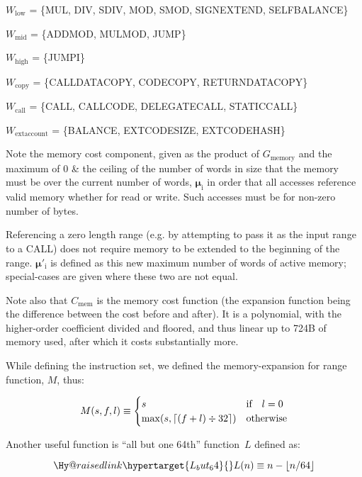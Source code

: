 \documentclass[9pt,oneside]{amsart}
\makeatletter
\newcommand{\linkdest}[1]{\Hy@raisedlink{\hypertarget{#1}{}}}
\DeclarePairedDelimiter{\ceil}{\lceil}{\rceil}
\makeatother
\begin{document}
$W_{\mathrm{low}}$ = \{{\small MUL}, {\small DIV}, {\small SDIV}, {\small MOD}, {\small SMOD}, {\small SIGNEXTEND}, {\small SELFBALANCE}\}

$W_{\mathrm{mid}}$ = \{{\small ADDMOD}, {\small MULMOD}, {\small JUMP}\}

$W_{\mathrm{high}}$ = \{{\small JUMPI}\}

$W_{\mathrm{copy}}$ = \{{\small CALLDATACOPY}, {\small CODECOPY}, {\small RETURNDATACOPY}\}

$W_{\mathrm{call}}$ = \{{\small CALL}, {\small CALLCODE}, {\small DELEGATECALL}, {\small STATICCALL}\}

$W_{\mathrm{extaccount}}$ = \{{\small BALANCE}, {\small EXTCODESIZE}, {\small EXTCODEHASH}\}

Note the memory cost component, given as the product of $G_{\mathrm{memory}}$ and the maximum of 0 \& the ceiling of the number of words in size that the memory must be over the current number of words, $\boldsymbol{\mu}_{\mathrm{i}}$ in order that all accesses reference valid memory whether for read or write. Such accesses must be for non-zero number of bytes.

Referencing a zero length range (e.g. by attempting to pass it as the input range to a CALL) does not require memory to be extended to the beginning of the range. $\boldsymbol{\mu}'_{\mathrm{i}}$ is defined as this new maximum number of words of active memory; special-cases are given where these two are not equal.

Note also that $C_{\mathrm{mem}}$ is the memory cost function (the expansion function being the difference between the cost before and after). It is a polynomial, with the higher-order coefficient divided and floored, and thus linear up to 724B of memory used, after which it costs substantially more.

While defining the instruction set, we defined the memory-expansion for range function, $M$, thus:

\nopagebreak
\begin{equation}
M(s, f, l) \equiv \begin{cases}
s & \text{if} \quad l = 0 \\
\max(s, \ceil{ (f + l) \div 32 }) & \text{otherwise}
\end{cases}
\end{equation}

Another useful function is ``all but one 64th'' function~$L$ defined as:

\begin{equation}
\linkdest{L_but_64}{}
L(n) \equiv n - \lfloor n / 64 \rfloor
\end{equation}
\end{document}

